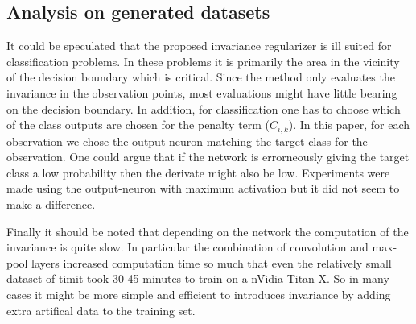 \subsection{Analysis on generated datasets}
It could be speculated that the proposed invariance regularizer is ill suited for classification problems. In these problems it is primarily the area in the vicinity of the decision boundary which is critical. Since the method only evaluates the invariance in the observation points, most evaluations might have little bearing on the decision boundary. In addition, for classification one has to choose which of the class outputs are chosen for the penalty term ($C_{i,k}$). In this paper, for each observation we chose the output-neuron matching the target class for the observation. One could argue that if the network is errorneously giving the target class a low probability then the derivate might also be low. Experiments were made using the output-neuron with maximum activation but it did not seem to make a difference.

Finally it should be noted that depending on the network the computation of the invariance is quite slow. In particular the combination of convolution and max-pool layers increased computation time so much that even the relatively small dataset of timit took 30-45 minutes to train on a nVidia Titan-X. So in many cases it might be more simple and efficient to introduces invariance by adding extra artifical data to the training set.
